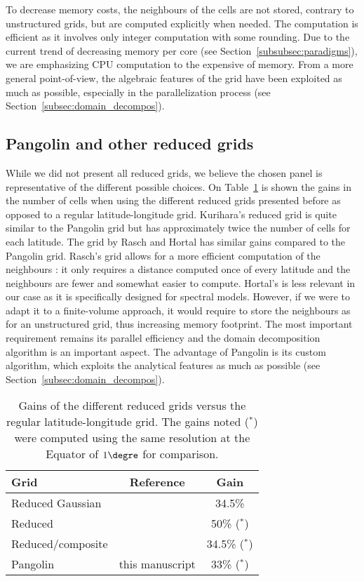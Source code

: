 To decrease memory costs, the neighbours of the cells are not stored, contrary
to unstructured grids, but are computed explicitly when needed.
The computation is efficient as it involves only integer computation with some
rounding. Due to the current trend of decreasing memory per core (see
Section~\ref{subsubsec:paradigms}), we are emphasizing CPU computation to the
expensive of memory. From a more general point-of-view, the algebraic features
of the grid have been exploited as much as possible, especially in the
parallelization process (see Section~\ref{subsec:domain_decompos}).

\subsection{Pangolin and other reduced grids}
While we did not present all reduced grids, we believe the chosen panel is
representative of the different possible choices.  On Table~\ref{tab:reduced} is
shown the gains in the number of cells when using the different reduced grids
presented before as opposed to a regular latitude-longitude grid.  Kurihara's
reduced grid is quite similar to the Pangolin grid but has approximately twice
the number of cells for each latitude. The grid by Rasch
and Hortal has similar gains compared to the Pangolin grid. Rasch's grid
allows for a more efficient computation of the neighbours : it only requires a
distance computed once of every latitude and the neighbours are fewer and
somewhat easier to compute.  Hortal's is less relevant in our case as it is
specifically designed for spectral models. However, if we were to adapt it to a
finite-volume approach, it would require to store the neighbours as for an
unstructured grid, thus increasing memory footprint. The most important requirement
remains its parallel efficiency and the domain decomposition algorithm is an
important aspect. The advantage of Pangolin is its custom algorithm, which
exploits the analytical features as much as possible (see
Section~\ref{subsec:domain_decompos}).

\def\Ast{($^{\ast}$) }
\begin{table}
  \centering
  \caption{Gains of the different reduced grids versus the regular
    latitude-longitude grid. The gains noted \Ast were computed using the
  same resolution at the Equator of $1\degre$ for comparison.}
  \label{tab:reduced}
  \begin{tabular}{lcc}
    \toprule
    Grid & Reference & Gain\\
    \midrule 
    Reduced Gaussian & \cite{Hortal1990} & 34.5\% \\
    Reduced & \cite{Kurihara1965} & 50\% \Ast\\
    Reduced/composite & \cite{Rasch1994} & 34.5\% \Ast \\
    Pangolin & this manuscript & 33\% \Ast\\
   \bottomrule
  \end{tabular}
\end{table}

